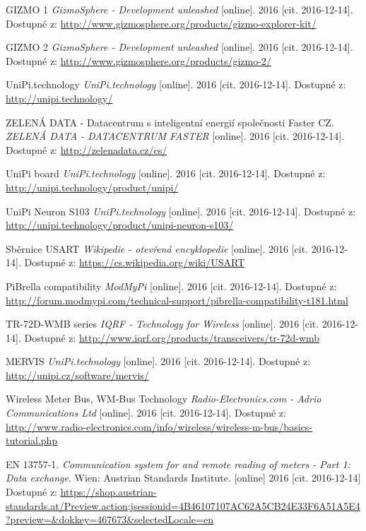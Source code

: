 \begin{literatura}{99}
 GIZMO 1 \textit{GizmoSphere - Development unleashed} [online]. 2016 [cit. 2016-12-14]. Dostupné z: \url{http://www.gizmosphere.org/products/gizmo-explorer-kit/}

 GIZMO 2 \textit{GizmoSphere - Development unleashed} [online]. 2016 [cit. 2016-12-14]. Dostupné z: \url{http://www.gizmosphere.org/products/gizmo-2/}


 UniPi.technology \textit{UniPi.technology} [online]. 2016 [cit. 2016-12-14]. Dostupné z: \url{http://unipi.technology/}

 ZELENÁ DATA - Datacentrum s inteligentní energií společnosti Faster CZ. \textit{ZELENÁ DATA - DATACENTRUM FASTER} [online]. 2016 [cit. 2016-12-14]. Dostupné z: \url{http://zelenadata.cz/cs/}

 UniPi board \textit{UniPi.technology} [online]. 2016 [cit. 2016-12-14]. Dostupné z: \url{http://unipi.technology/product/unipi/}
				
 UniPi Neuron S103 \textit{UniPi.technology} [online]. 2016 [cit. 2016-12-14]. Dostupné z: \url{http://unipi.technology/product/unipi-neuron-s103/}

 Sběrnice USART \textit{Wikipedie - otevřená encyklopedie} [online]. 2016 [cit. 2016-12-14]. Dostupné z: \url{https://cs.wikipedia.org/wiki/USART}

 PiBrella compatibility \textit{ModMyPi} [online]. 2016 [cit. 2016-12-14]. Dostupné z: \url{http://forum.modmypi.com/technical-support/pibrella-compatibility-t181.html}

 TR-72D-WMB series \textit{IQRF - Technology for Wireless} [online]. 2016 [cit. 2016-12-14]. Dostupné z: \url{http://www.iqrf.org/products/transceivers/tr-72d-wmb}

 MERVIS \textit{UniPi.technology} [online]. 2016 [cit. 2016-12-14]. Dostupné z: \url{http://unipi.cz/software/mervis/}

 Wireless Meter Bus, WM-Bus Technology \textit{Radio-Electronics.com - Adrio Communications Ltd} [online]. 2016 [cit. 2016-12-14]. Dostupné z: \url{http://www.radio-electronics.com/info/wireless/wireless-m-bus/basics-tutorial.php}

 EN 13757-1. \textit{Communication system for and remote reading of meters - Part 1: Data exchange}. Wien: Austrian Standards Institute. [online] 2016 [cit. 2016-12-14]  Dostupné z: \url{https://shop.austrian-standards.at/Preview.action;jsessionid=4B46107107AC62A5CB24E33F6A51A5E4?preview=\&dokkey=467673\&selectedLocale=en}


\end{literatura}
